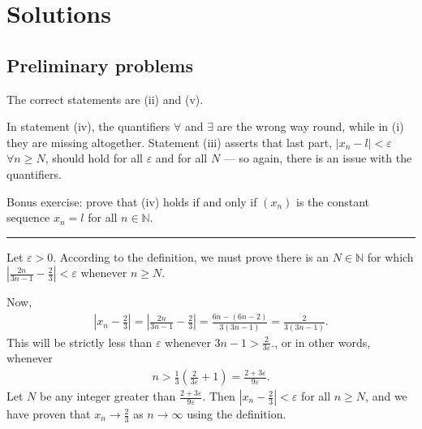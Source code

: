 \documentclass[letterpaper,10pt,english]{jupyterBook}
\begin{document}
\sphinxstepscope


\section{Solutions}
\label{\detokenize{Solutions-full:solutions}}\label{\detokenize{Solutions-full:sol}}\label{\detokenize{Solutions-full::doc}}

\subsection{Preliminary problems}
\label{\detokenize{Solutions-full:preliminary-problems}}\label{\detokenize{Solutions-full:ch1sol}}
\sphinxAtStartPar
{\hyperref[\detokenize{Problems:p1}]{}}
The correct statements are (ii) and (v).

\sphinxAtStartPar
In statement (iv), the quantifiers \(\forall\) and \(\exists\) are the wrong way round, while in (i) they are missing altogether. Statement (iii) asserts that last part, \(|x_n-l|<\varepsilon\) \(\forall n\geq N\), should hold for all \(\varepsilon\) and for all \(N\) — so again, there is an issue with the quantifiers.

\sphinxAtStartPar
Bonus exercise: prove that (iv) holds if and only if \((x_n)\) is the constant sequence \(x_n=l\) for all \(n\in\mathbb{N}\).


\bigskip\hrule\bigskip

\label{\detokenize{Solutions-full:p2sol}}
\sphinxAtStartPar
{\hyperref[\detokenize{Problems:p2}]{}} 

\sphinxAtStartPar
Let \(\varepsilon>0\). According to the definition, we must prove there is an \(N\in\mathbb{N}\) for which \(\left|\frac{2n}{3n-1}-\frac{2}{3}\right|<\varepsilon\) whenever \(n\geq N\).

\sphinxAtStartPar
Now,
\begin{equation*}
\begin{split}
\left|x_n-\frac{2}{3}\right| = \left|\frac{2n}{3n-1}-\frac{2}{3}\right| = \frac{6n-(6n-2)}{3(3n-1)} = \frac{2}{3(3n-1)}.
\end{split}
\end{equation*}
\sphinxAtStartPar
This will be strictly less than \(\varepsilon\) whenever \(3n-1>\frac{2}{3\varepsilon}\)., or in other words, whenever
\begin{equation*}
\begin{split}
n>\frac{1}{3}\left(\frac{2}{3\varepsilon}+1\right)=\frac{2+3\varepsilon}{9\varepsilon}.
\end{split}
\end{equation*}
\sphinxAtStartPar
Let \(N\) be any integer greater than \(\frac{2+3\varepsilon}{9\varepsilon}\). Then \(\left|x_n-\frac{2}{3}\right|<\varepsilon\) for all \(n\geq N\), and we have proven that \(x_n\rightarrow\frac{2}{3}\) as \(n\rightarrow\infty\) using the definition.
\end{document}
